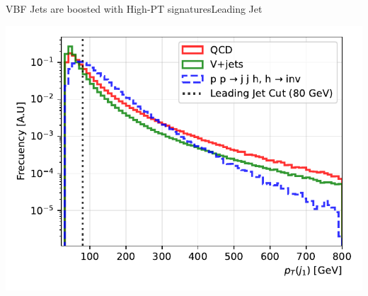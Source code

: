 \documentclass{../../bredelebeamer}
\begin{document}
\begin{frame}{VBF Jets are boosted with High-PT signatures}{Leading Jet}
    \begin{minipage}{0.97\textwidth}
        \includegraphics[width=\textwidth]{../Images/leading_jet_pt_comparison.pdf}
    \end{minipage}
\end{frame}
\end{document}
